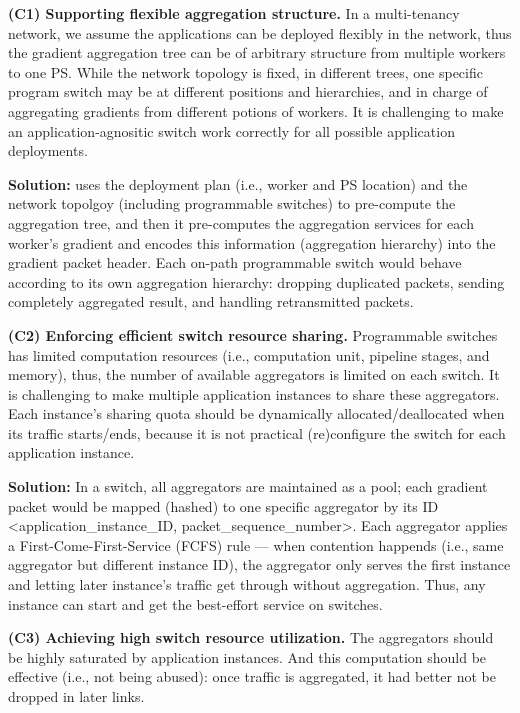 \textbf{(C1) Supporting flexible aggregation structure.} In a multi-tenancy network, we assume the applications can be deployed flexibly in the network, thus the gradient aggregation tree can be of arbitrary structure from multiple workers to one PS. While the network topology is fixed, in different trees, one specific program switch may be at different positions and hierarchies, and in charge of aggregating gradients from different potions of workers. It is challenging to make an application-agnositic switch work correctly for all possible application deployments.

\textbf{Solution:} \sysname uses the deployment plan (i.e., worker and PS location) and the network topolgoy (including programmable switches) to pre-compute the aggregation tree, and then it pre-computes the aggregation services for each worker's gradient and encodes this information (aggregation hierarchy) into the gradient packet header. Each on-path programmable switch would behave according to its own aggregation hierarchy: dropping duplicated packets, sending completely aggregated result, and handling retransmitted packets.



\textbf{(C2) Enforcing efficient switch resource sharing.} Programmable switches has limited computation resources (i.e., computation unit, pipeline stages, and memory), thus, the number of available aggregators is limited on each switch. It is challenging to make multiple \sysname application instances to share these aggregators. Each instance's sharing quota should be dynamically allocated/deallocated when its traffic starts/ends, because it is not practical (re)configure the switch for each application instance. 

\textbf{Solution:} In a switch, all aggregators are maintained as a pool; each gradient packet would be mapped (hashed) to one specific aggregator by its ID <application\_instance\_ID, packet\_sequence\_number>. Each aggregator applies a First-Come-First-Service (FCFS) rule --- when contention happends (i.e., same aggregator but different instance ID), the aggregator only serves the first instance and letting later instance's traffic get through without aggregation. Thus, any \sysname instance can start and get the best-effort service on switches.


\textbf{(C3) Achieving high switch resource utilization.} The aggregators should be highly saturated by \sysname application instances. And this computation should be effective (i.e., not being abused): once traffic is aggregated, it had better not be dropped in later links.

